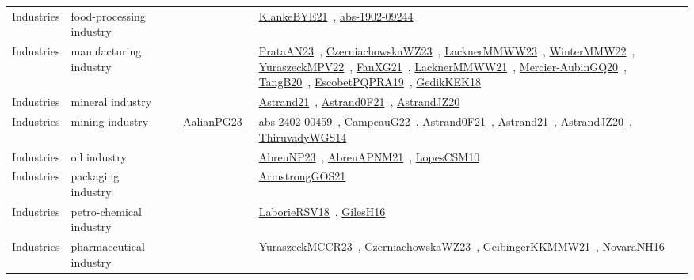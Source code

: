 {\begin{longtable}{lp{3cm}>{\raggedright\arraybackslash}p{6cm}>{\raggedright\arraybackslash}p{6cm}>{\raggedright\arraybackslash}p{8cm}}
Industries & food-processing industry &  &  & \href{works/KlankeBYE21.pdf}{KlankeBYE21}~\cite{KlankeBYE21}, \href{works/abs-1902-09244.pdf}{abs-1902-09244}~\cite{abs-1902-09244}\\
Industries & manufacturing industry &  &  & \href{works/PrataAN23.pdf}{PrataAN23}~\cite{PrataAN23}, \href{works/CzerniachowskaWZ23.pdf}{CzerniachowskaWZ23}~\cite{CzerniachowskaWZ23}, \href{works/LacknerMMWW23.pdf}{LacknerMMWW23}~\cite{LacknerMMWW23}, \href{works/WinterMMW22.pdf}{WinterMMW22}~\cite{WinterMMW22}, \href{works/YuraszeckMPV22.pdf}{YuraszeckMPV22}~\cite{YuraszeckMPV22}, \href{works/FanXG21.pdf}{FanXG21}~\cite{FanXG21}, \href{works/LacknerMMWW21.pdf}{LacknerMMWW21}~\cite{LacknerMMWW21}, \href{works/Mercier-AubinGQ20.pdf}{Mercier-AubinGQ20}~\cite{Mercier-AubinGQ20}, \href{works/TangB20.pdf}{TangB20}~\cite{TangB20}, \href{works/EscobetPQPRA19.pdf}{EscobetPQPRA19}~\cite{EscobetPQPRA19}, \href{works/GedikKEK18.pdf}{GedikKEK18}~\cite{GedikKEK18}\\
Industries & mineral industry &  &  & \href{works/Astrand21.pdf}{Astrand21}~\cite{Astrand21}, \href{works/Astrand0F21.pdf}{Astrand0F21}~\cite{Astrand0F21}, \href{works/AstrandJZ20.pdf}{AstrandJZ20}~\cite{AstrandJZ20}\\
Industries & mining industry &  & \href{works/AalianPG23.pdf}{AalianPG23}~\cite{AalianPG23} & \href{works/abs-2402-00459.pdf}{abs-2402-00459}~\cite{abs-2402-00459}, \href{works/CampeauG22.pdf}{CampeauG22}~\cite{CampeauG22}, \href{works/Astrand0F21.pdf}{Astrand0F21}~\cite{Astrand0F21}, \href{works/Astrand21.pdf}{Astrand21}~\cite{Astrand21}, \href{works/AstrandJZ20.pdf}{AstrandJZ20}~\cite{AstrandJZ20}, \href{works/ThiruvadyWGS14.pdf}{ThiruvadyWGS14}~\cite{ThiruvadyWGS14}\\
Industries & oil industry &  &  & \href{works/AbreuNP23.pdf}{AbreuNP23}~\cite{AbreuNP23}, \href{works/AbreuAPNM21.pdf}{AbreuAPNM21}~\cite{AbreuAPNM21}, \href{works/LopesCSM10.pdf}{LopesCSM10}~\cite{LopesCSM10}\\
Industries & packaging industry &  &  & \href{works/ArmstrongGOS21.pdf}{ArmstrongGOS21}~\cite{ArmstrongGOS21}\\
Industries & petro-chemical industry &  &  & \href{works/LaborieRSV18.pdf}{LaborieRSV18}~\cite{LaborieRSV18}, \href{works/GilesH16.pdf}{GilesH16}~\cite{GilesH16}\\
Industries & pharmaceutical industry &  &  & \href{works/YuraszeckMCCR23.pdf}{YuraszeckMCCR23}~\cite{YuraszeckMCCR23}, \href{works/CzerniachowskaWZ23.pdf}{CzerniachowskaWZ23}~\cite{CzerniachowskaWZ23}, \href{works/GeibingerKKMMW21.pdf}{GeibingerKKMMW21}~\cite{GeibingerKKMMW21}, \href{works/NovaraNH16.pdf}{NovaraNH16}~\cite{NovaraNH16}\\

\end{longtable}}
